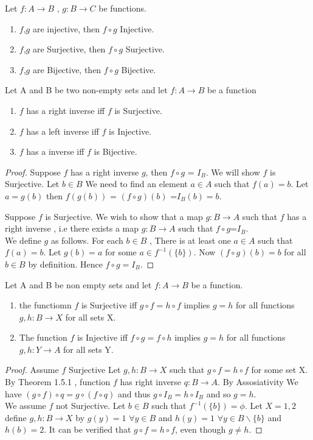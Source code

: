 \documentclass[a4paper,english,12pt]{article}   	%
\begin{document}
\begin{lem}
Let $f \colon A \to B$ , $g \colon B \to C$ be functions.
\begin{enumerate}
\item  $f$,$g$ are injective, then $f \circ g$ Injective.
\item  $f$,$g$ are Surjective, then $f \circ g$ Surjective.
\item  $f$,$g$ are Bijective, then $f \circ g$ Bijective.
\end{enumerate}
\end{lem}
\begin{thm}
Let A and B be two non-empty sets and let $f \colon A \to B$ be a function
\begin{enumerate}
\item $f$ has a right inverse iff $f$ is Surjective.
\item $f$ has a left inverse iff $f$ is Injective.
\item $f$ has a inverse iff $f$ is Bijective.
\end{enumerate}
\end{thm}
\begin{proof} Suppose $f$ has a right inverse $g$, then 
$f \circ g$ = $I_{B}$. We will show $f$ is Surjective.
Let $b \in B$ We need to find an element $a \in A $ such that $f(a)=b$. Let $a=g(b)$ then $f(g(b))$ = $(f \circ g)(b)$ =$I_{B}(b)=b$.
\par
Suppose $f$ is Surjective. We wish to show that a map $g \colon B \to A$ such that $f$ has a right inverse , i.e there exists a map
$g \colon B \to A$ such that $f \circ g$=$I_{B}$.\\
We define $g$ as follows. For each $b \in B$ , There is at least one $a \in A$ such that $f(a)=b$. Let $g(b)=a$ for some $a \in f^{-1}(\{b\})$.
Now $(f \circ g)(b)=b$ for all $b \in B$ by definition. Hence $f \circ g = I_{B}$.

\end{proof} 
\begin{thm} Let A and B be non empty sets and let $f \colon A \to B$ be a function.
\begin{enumerate}
\item the functiomn $f$ is Surjective iff $g \circ f = h \circ f$ implies $g=h$ for all functions $g,h \colon B \to X$ for all sets X.
\item The function $f$ is Injective iff $f \circ g = f \circ h$ implies $g=h$ for all functions $g,h \colon Y \to A$ for all sets Y.
\end{enumerate}
\begin{proof}
Assume $f$ Surjective Let $g,h \colon B \to X$ such that $g \circ f = h \circ f$ for some set X. By Theorem 1.5.1 , function $f$ has right inverse $q \colon B \to A$. By Assosiativity We have $(g \circ f) \circ q = g \circ (f \circ q) $ and thus $g \circ I_{B} = h \circ I_{B}$ and so $g=h$.\\
We assume $f$ not Surjective. Let $b \in B$ such that $f^{-1}(\{b\})= \phi$. Let $X={1,2}$ define $g,h \colon B \to X$ by $g(y)=1$ $\forall y \in B$ and $h(y)=1$ $ \forall y \in B \backslash \{b\}$ and $h(b)=2$. It can be verified that $g \circ f = h \circ f$, even though $g \neq h$.
\end{proof}
\end{thm}
\end{document}
